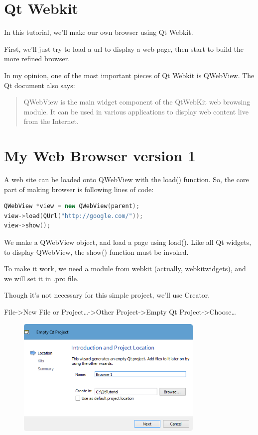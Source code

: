 

\section{Qt Webkit}\label{qt-webkit}

In this tutorial, we'll make our own browser using Qt Webkit.

First, we'll just try to load a url to display a web page, then start to
build the more refined browser.

In my opinion, one of the most important pieces of Qt Webkit is
QWebView. The Qt document also says:

\begin{quote}
QWebView is the main widget component of the QtWebKit web browsing
module. It can be used in various applications to display web content
live from the Internet.
\end{quote}

\section{My Web Browser version 1}\label{my-web-browser-version-1}

A web site can be loaded onto QWebView with the load() function. So, the
core part of making browser is following lines of code:

\begin{lstlisting}[language=c++, numbers=none]
QWebView *view = new QWebView(parent);
view->load(QUrl("http://google.com/"));
view->show();
\end{lstlisting}

We make a QWebView object, and load a page using load(). Like all Qt
widgets, to display QWebView, the show() function must be invoked.

To make it work, we need a module from webkit (actually, webkitwidgets),
and we will set it in .pro file.

Though it's not necessary for this simple project, we'll use Creator.

File-\textgreater{}New File or Project\ldots{}-\textgreater{}Other
Project-\textgreater{}Empty Qt Project-\textgreater{}Choose\ldots{}

\begin{figure}[htbp]
\centering
\includegraphics[width=0.8\textwidth]{images/Browser1_Empty_Project.png}
\caption{}
\end{figure}

